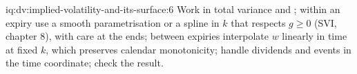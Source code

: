 \begin{solution}{iq:dv:implied-volatility-and-its-surface:6}
Work in total variance and ; within an expiry use a smooth parametrisation or a
spline in $k$ that respects $g\ge0$ (SVI, chapter 8), with care at the ends; between expiries
interpolate $w$ linearly in time at fixed $k$, which preserves calendar monotonicity; handle
dividends and events in the time coordinate; check the result.
\end{solution}
